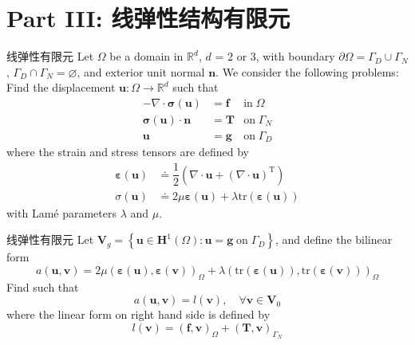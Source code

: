 \documentclass[lang=en,aspectratio=43,theme=default,logo=on]{simplebeamer}
\begin{document}
\section{Part III: 线弹性结构有限元}

\begin{frame}{线弹性有限元}
    Let $\Omega$ be a domain in $\mathbb{R}^d$, $d$ = 2 or 3, with boundary $\partial \Omega = \Gamma_D \cup \Gamma_N$, $\Gamma_D \cap \Gamma_N = \varnothing$, and exterior unit normal $\mathbf{n}$. We consider the following problems: \\
    Find the displacement $\mathbf{u} : \Omega \to \mathbb{R}^d$ such that
    \begin{align*}
        -\nabla \cdot \boldsymbol{\sigma} (\mathbf{u}) &= \mathbf{f} &\mathrm{in} \;\Omega \\
        \boldsymbol{\sigma} (\mathbf{u}) \cdot \mathbf{n} &= \mathbf{T} &\mathrm{on} \; \Gamma_N \\
        \mathbf{u} &= \mathbf{g} &\mathrm{on} \; \Gamma_D
    \end{align*}
    where the strain and stress tensors are defined by
    \begin{align*}
        \boldsymbol{\varepsilon} (\mathbf{u}) &\doteq \dfrac{1}{2} \left( \nabla \cdot \mathbf{u} + (\nabla \cdot \mathbf{u} )^{\mathrm{T}} \right) \\
        \sigma (\mathbf{u}) &\doteq 2\mu \boldsymbol{\varepsilon} (\mathbf{u}) + \lambda \mathrm{tr}(\boldsymbol{\varepsilon} (\mathbf{u}))
    \end{align*}
    with Lamé parameters $\lambda$ and $\mu$.

\end{frame}

\begin{frame}{线弹性有限元}
    Let $\mathbf{V}_g = \left\{ \mathbf{u} \in \mathbf{H}^1(\Omega) : \mathbf{u} = \mathbf{g} \; \mathrm{on} \; \Gamma_D\right\}$, and define the bilinear form
    \begin{equation*}
        a(\mathbf{u},\mathbf{v})=2\mu \left( \boldsymbol{\varepsilon}(\mathbf{u}), \boldsymbol{\varepsilon}(\mathbf{v})\right)_\Omega + \lambda \left( \mathrm{tr}(\boldsymbol{\varepsilon}(\mathbf{u})), \mathrm{tr}(\boldsymbol{\varepsilon}(\mathbf{v}))\right)_\Omega
    \end{equation*}
    Find such that
    \begin{equation*}
        a(\mathbf{u}, \mathbf{v})=l(\mathbf{v}), \quad \forall \mathbf{v} \in \mathbf{V}_0
    \end{equation*}
    where the linear form on right hand side is defined by
    \begin{equation*}
        l(\mathbf{v})=\left( \mathbf{f} , \mathbf{v}\right)_\Omega + \left( \mathbf{T} , \mathbf{v}\right)_{\Gamma_N}
    \end{equation*}
\end{frame}
\end{document}
